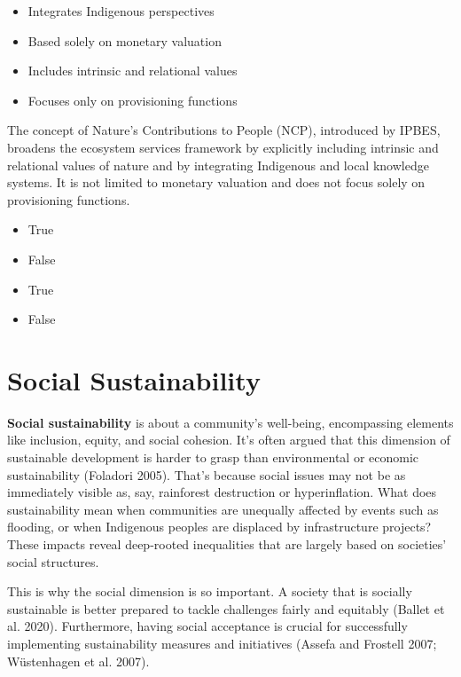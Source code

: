 \documentclass[
  a4paper,
  DIV=11,
  numbers=noendperiod,
  oneside,
  openany]{scrreprt}
\providecommand{\tightlist}{%
  \setlength{\itemsep}{0pt}\setlength{\parskip}{0pt}}
\begin{document}
\begin{itemize}
\tightlist
\item[$\square$]
  Integrates Indigenous perspectives
\item[$\square$]
  Based solely on monetary valuation
\item[$\square$]
  Includes intrinsic and relational values
\item[$\square$]
  Focuses only on provisioning functions
\end{itemize}

The concept of Nature's Contributions to People (NCP), introduced by
IPBES, broadens the ecosystem services framework by explicitly including
intrinsic and relational values of nature and by integrating Indigenous
and local knowledge systems. It is not limited to monetary valuation and
does not focus solely on provisioning functions.

\begin{itemize}
\tightlist
\item
  True
\item
  False
\item
  True
\item
  False
\end{itemize}

\chapter{Social Sustainability}\label{social-sustainability}

\textbf{Social sustainability} is about a community's well-being,
encompassing elements like inclusion, equity, and social cohesion. It's
often argued that this dimension of sustainable development is harder to
grasp than environmental or economic sustainability (Foladori 2005).
That's because social issues may not be as immediately visible as, say,
rainforest destruction or hyperinflation. What does sustainability mean
when communities are unequally affected by events such as flooding, or
when Indigenous peoples are displaced by infrastructure projects? These
impacts reveal deep-rooted inequalities that are largely based on
societies' social structures.

This is why the social dimension is so important. A society that is
socially sustainable is better prepared to tackle challenges fairly and
equitably (Ballet et al. 2020). Furthermore, having social acceptance is
crucial for successfully implementing sustainability measures and
initiatives (Assefa and Frostell 2007; Wüstenhagen et al. 2007).
\end{document}
